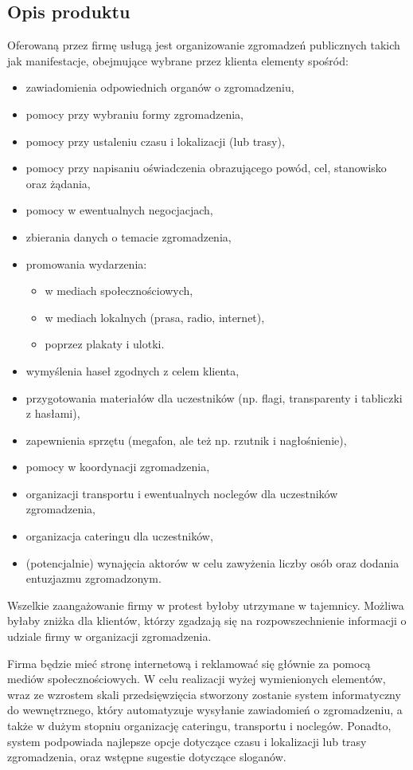 \documentclass{article}
\begin{document}
\subsection{Opis produktu}
Oferowaną przez firmę usługą jest organizowanie zgromadzeń publicznych takich jak manifestacje, obejmujące wybrane przez klienta elementy spośród:
\begin{itemize}
\item zawiadomienia odpowiednich organów o zgromadzeniu,
\item pomocy przy wybraniu formy zgromadzenia,
\item pomocy przy ustaleniu czasu i lokalizacji (lub trasy),
\item pomocy przy napisaniu oświadczenia obrazującego powód, cel, stanowisko oraz żądania,
\item pomocy w ewentualnych negocjacjach,
\item zbierania danych o temacie zgromadzenia,
\item promowania wydarzenia: 
	\begin{itemize}
	\item w mediach społecznościowych,
	\item w mediach lokalnych (prasa, radio, internet),
	\item poprzez plakaty i ulotki.
	\end{itemize}
\item wymyślenia haseł zgodnych z celem klienta,
\item przygotowania materiałów dla uczestników (np. flagi, transparenty i tabliczki z hasłami),
\item zapewnienia sprzętu (megafon, ale też np. rzutnik i nagłośnienie),
\item pomocy w koordynacji zgromadzenia,
\item organizacji transportu i ewentualnych noclegów dla uczestników zgromadzenia,
\item organizacja cateringu dla uczestników,
\item (potencjalnie) wynajęcia aktorów w celu zawyżenia liczby osób oraz dodania entuzjazmu zgromadzonym.
\end{itemize}
Wszelkie zaangażowanie firmy w protest byłoby utrzymane w tajemnicy. Możliwa byłaby zniżka dla klientów, którzy zgadzają się na rozpowszechnienie informacji o udziale firmy w organizacji zgromadzenia. 

Firma będzie mieć stronę internetową i reklamować się głównie za pomocą mediów społecznościowych. W celu realizacji wyżej wymienionych elementów, wraz ze wzrostem skali przedsięwzięcia stworzony zostanie system informatyczny do wewnętrznego, który automatyzuje wysyłanie zawiadomień o zgromadzeniu, a także w dużym stopniu organizację cateringu, transportu i noclegów. Ponadto, system podpowiada najlepsze opcje dotyczące czasu i lokalizacji lub trasy zgromadzenia, oraz wstępne sugestie dotyczące sloganów.
\end{document}

